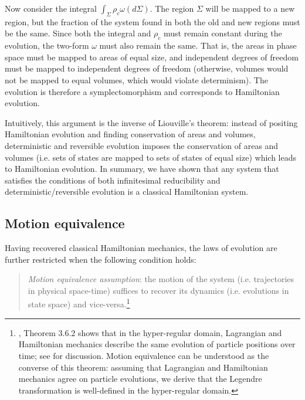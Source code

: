\documentclass[letterpaper]{article}
\begin{document}
Now consider the integral $\int_{\Sigma} \rho_c \omega(d\Sigma)$. The region $\Sigma$ will be mapped to a new region, but the fraction of the system found in both the old and new regions must be the same. Since both the integral and $\rho_c$ must remain constant during the evolution, the two-form $\omega$ must also remain the same. That is, the areas in phase space must be mapped to areas of equal size, and independent degrees of freedom must be mapped to independent degrees of freedom (otherwise, volumes would not be mapped to equal volumes, which would violate determinism). The evolution is therefore a symplectomorphism and corresponds to Hamiltonian evolution. 

Intuitively, this argument is the inverse of Liouville's theorem: instead of positing Hamiltonian evolution and finding conservation of areas and volumes, deterministic and reversible evolution imposes the conservation of areas and volumes (i.e. sets of states are mapped to sets of states of equal size) which leads to Hamiltonian evolution. In summary, we have shown that any system that satisfies the conditions of both infinitesimal reducibility and deterministic/reversible evolution is a classical Hamiltonian system.


\subsection{Motion equivalence}
\label{motion}

Having recovered classical Hamiltonian mechanics, the laws of evolution are further restricted when the following condition holds:

\begin{quotation}
\noindent
\textit{Motion equivalence assumption}: the motion of the system (i.e. trajectories in physical space-time) suffices to recover its dynamics (i.e. evolutions in state space) and vice-versa.\footnote{ \textcites[218]{Abraham}, Theorem 3.6.2 shows that in the hyper-regular domain, Lagrangian and Hamiltonian mechanics describe the same evolution of particle positions over time; see \textcites[1180-1181]{Barrett2} for discussion. Motion equivalence can be understood as the converse of this theorem: assuming that Lagrangian and Hamiltonian mechanics agree on particle evolutions, we derive that the Legendre transformation is well-defined in the hyper-regular domain.}
\end{quotation}
\end{document}
